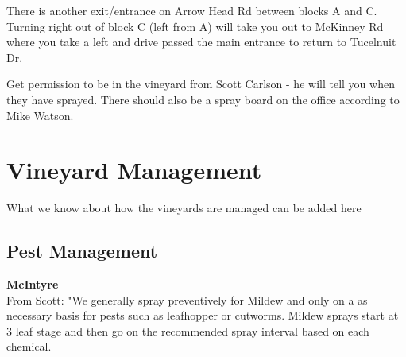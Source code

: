 \documentclass[11pt,letter]{article}
\begin{document}
There is another exit/entrance on Arrow Head Rd between blocks A and C. Turning right out of block C (left from A) will take you out to McKinney Rd where you take a left and drive passed the main entrance to return to Tucelnuit Dr.

Get permission to be in the vineyard from Scott Carlson - he will tell you when they have sprayed. There should also be a spray board on the office according to Mike Watson. \\





\section{Vineyard Management}
What we know about how the vineyards are managed can be added here
\subsection{Pest Management}
{\bf McIntyre} \\ %
From Scott:
"We generally spray preventively for Mildew and only on a as necessary basis for pests such as leafhopper or cutworms. Mildew sprays start at 3 leaf stage and then go on the recommended spray interval based on each chemical. \\
\end{document}
